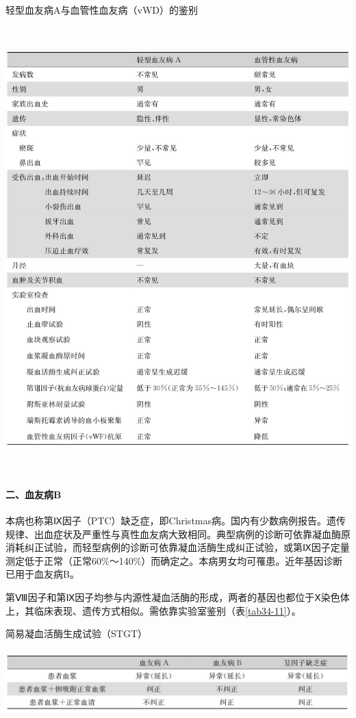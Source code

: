 \begin{table}[htbp]
\centering
\caption{轻型血友病A与血管性血友病（vWD）的鉴别}
\label{tab34-10}
\includegraphics[width=5.88542in,height=6.77083in]{./images/Image00205.jpg}
\end{table}

\paragraph{二、血友病B}

本病也称第Ⅸ因子（PTC）缺乏症，即Christmas病。国内有少数病例报告。遗传规律、出血症状及严重性与真性血友病大致相同。典型病例的诊断可依靠凝血酶原消耗纠正试验，而轻型病例的诊断可依靠凝血活酶生成纠正试验，或第Ⅸ因子定量测定低于正常（正常60\%～140\%）而确定之。本病男女均可罹患。近年基因诊断已用于血友病B。

第Ⅷ因子和第Ⅸ因子均参与内源性凝血活酶的形成，两者的基因也都位于Ⅹ染色体上，其临床表现、遗传方式相似。需依靠实验室鉴别（表\ref{tab34-11}）。

\begin{table}[htbp]
\centering
\caption{简易凝血活酶生成试验（STGT）}
\label{tab34-11}
\includegraphics[width=5.90625in,height=1in]{./images/Image00206.jpg}
\end{table}

